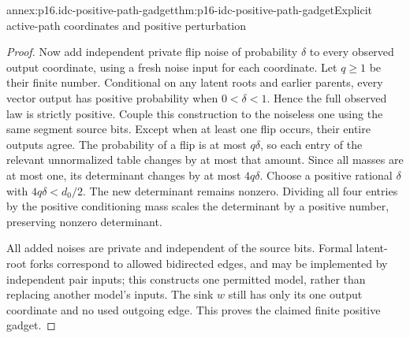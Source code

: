 \begin{annexitem}{annex:p16.idc-positive-path-gadget}{thm:p16-idc-positive-path-gadget}{Explicit active-path coordinates and positive perturbation}
\begin{proof}
Now add independent private flip noise of probability \(\delta\)
to every observed output coordinate, using a fresh noise input
for each coordinate. Let \(q\geq1\) be their finite number.
Conditional on any latent roots and earlier parents, every vector
output has positive probability when \(0<\delta<1\). Hence
the full observed law is strictly positive. Couple this construction
to the noiseless one using the same segment source bits. Except
when at least one flip occurs, their entire outputs agree. The
probability of a flip is at most \(q\delta\), so each entry
of the relevant unnormalized table changes by at most that amount.
Since all masses are at most one, its determinant changes by at
most \(4q\delta\). Choose a positive rational \(\delta\)
with \(4q\delta<d_0/2\). The new determinant remains nonzero.
Dividing all four entries by the positive conditioning mass scales
the determinant by a positive number, preserving nonzero determinant.

All added noises are private and independent of the source bits.
Formal latent-root forks correspond to allowed bidirected edges,
and may be implemented by independent pair inputs; this constructs
one permitted model, rather than replacing another model's inputs.
The sink \(w\) still has only its one output coordinate and
no used outgoing edge. This proves the claimed finite positive gadget.
\end{proof}
\end{annexitem}

